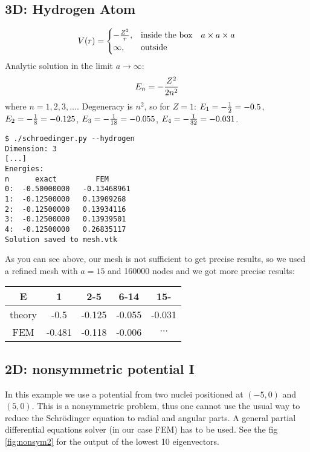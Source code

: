 



\subsection{3D: Hydrogen Atom}

$$V(r)=\begin{cases}-{Z^2\over r},&\text{inside the box}\quad a\times a\times a \\
\infty, & \text{outside}\end{cases}$$
Analytic solution in the limit $a\to\infty$:
$$E_n=-{Z^2\over2n^2}$$
where $n=1, 2, 3, \dots$.
Degeneracy is $n^2$, so for $Z=1$:
$E_1 = -{1\over2}=-0.5$,
$E_2 = -{1\over8}=-0.125$,
$E_3 = -{1\over18}=-0.055$,
$E_4 = -{1\over32}=-0.031$.

\begin{lstlisting}
$ ./schroedinger.py --hydrogen
Dimension: 3
[...]
Energies:
n      exact         FEM
0:  -0.50000000   -0.13468961
1:  -0.12500000   0.13909268
2:  -0.12500000   0.13934116
3:  -0.12500000   0.13939501
4:  -0.12500000   0.26835117
Solution saved to mesh.vtk
\end{lstlisting}

As you can see above, our mesh is not sufficient to get precise results, so we
used a refined mesh with $a=15$ and 160000 nodes and we got more precise
results:

\begin{tabular}{ c | c c c c }
E      & 1 & 2-5 & 6-14 & 15- \\
\hline
theory & -0.5 & -0.125 & -0.055 & -0.031 \\
FEM    & -0.481 & -0.118 & -0.006 & $\cdots$ \\
\end{tabular}

\subsection{2D: nonsymmetric potential I}

In this example we use a potential from two nuclei positioned at $(-5, 0)$ and
$(5, 0)$. This is a nonsymmetric problem, thus one cannot use the usual
way to reduce the Schr\"odinger equation to radial and angular
parts. A general partial differential equations solver (in our case FEM) has to
be used. See the fig \ref{fig:nonsym2} for the output of the lowest 10
eigenvectors.

